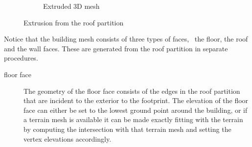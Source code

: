 \begin{figure}
\begin{subfigure}[b]{0.3\linewidth}
		\caption{Extruded 3D mesh}%
		\label{subfig:3ddcel}
	\end{subfigure}
	\caption{Extrusion from the roof partition}%
	\label{fig:extrusion}
\end{figure}
Notice that the building mesh consists of three types of faces, \ie\ the floor, the roof and the wall faces.
These are generated from the roof partition in separate procedures.

\begin{description}
\item[floor face] The geometry of the floor face consists of the edges in the roof partition that are incident to the exterior to the footprint. The elevation of the floor face can either be set to the lowest ground point around the building, or if a terrain mesh is available it can be made exactly fitting with the terrain by computing the intersection with that terrain mesh and setting the vertex elevations accordingly.


\end{description}
